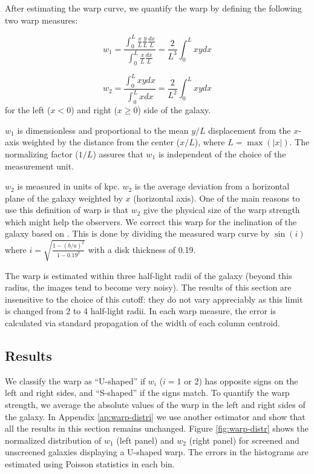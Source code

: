\documentclass[useAMS,usenatbib,twocolumn]{mn2e}
\begin{document}
After estimating the warp curve, we quantify the warp by defining the
following two warp measures:

\begin{equation}
w_1 =  \frac{\int_0^L \frac{x}{L} \frac{y}{L} \frac{dx}{L}}{\int_0^L
\frac{x}{L}\frac{dx}{L}}=\frac{2}{L^3} \int_0^L x y dx
\label{warp-param} 
\end{equation}

\begin{equation}
w_2 = \frac{\int_0^L{x y dx}}{\int_0^L{x dx}}=\frac{2}{L^2} \int_0^L x y dx
\label{warp-param2} 
\end{equation} 
for the left ($x < 0$) and right ($x \geq 0$) side of the galaxy.

$w_1$ is dimensionless and proportional to the mean $y/L$ displacement from the
$x$-axis weighted by the distance from the center ($x/L$),
where $L = \max(|x|)$.
The normalizing factor ($1/L$) assures that $w_1$ is independent
of the choice of the measurement unit.

$w_2$ is measured in units of kpc. $w_2$ is the average deviation from a
horizontal plane of the galaxy weighted by $x$ (horizontal axis). One of the
main reasons to use this definition of warp is that $w_2$ give the physical
size of the warp strength which might help the observers.  We
correct this warp for the inclination of the galaxy based on \citet{geha06}.
This is done by dividing the measured warp curve by $\sin(i)$ where $i =
\sqrt{\frac{1 - (b/a)^2}{1 - 0.19^2}}$ with a disk thickness of 0.19.


The warp is estimated within three half-light radii of the galaxy (beyond
this radius, the images tend to become very noisy).  The results of this
section are insensitive to the choice of this cutoff: they do not vary
appreciably as this limit is changed from 2 to 4 half-light radii.
In each warp measure, the error is calculated via standard propagation
of the width of each column centroid.

\subsection{Results}
We classify the warp as ``U-shaped'' if $w_i$ ($i=$1 or 2) has opposite signs on
the left
and right sides, and ``S-shaped'' if the signs match.
To quantify the warp strength, we average the absolute values of the
warp in the left and right sides of the galaxy. In Appendix
\ref{ap:warp-distri} we use another estimator and show that all the results in
this section remains unchanged.
Figure \ref{fig:warp-distr} shows the normalized distribution of $w_1$ 
(left panel) and $w_2$ (right panel) 
for screened and unscreened galaxies displaying a
U-shaped warp. The errors in the histograms are estimated using Poisson
statistics in each bin.
\end{document}
